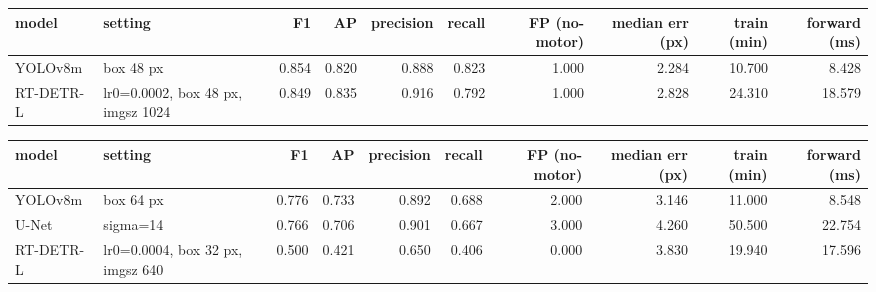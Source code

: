 \begin{tabular}{llrrrrrrrr}
\toprule
model & setting & F1 & AP & precision & recall & FP (no-motor) & median err (px) & train (min) & forward (ms) \\
\midrule
YOLOv8m & box 48 px & 0.854 & 0.820 & 0.888 & 0.823 & 1.000 & 2.284 & 10.700 & 8.428 \\
RT-DETR-L & lr0=0.0002, box 48 px, imgsz 1024 & 0.849 & 0.835 & 0.916 & 0.792 & 1.000 & 2.828 & 24.310 & 18.579 \\
\bottomrule
\end{tabular}

\begin{tabular}{llrrrrrrrr}
\toprule
model & setting & F1 & AP & precision & recall & FP (no-motor) & median err (px) & train (min) & forward (ms) \\
\midrule
YOLOv8m & box 64 px & 0.776 & 0.733 & 0.892 & 0.688 & 2.000 & 3.146 & 11.000 & 8.548 \\
U-Net & sigma=14 & 0.766 & 0.706 & 0.901 & 0.667 & 3.000 & 4.260 & 50.500 & 22.754 \\
RT-DETR-L & lr0=0.0004, box 32 px, imgsz 640 & 0.500 & 0.421 & 0.650 & 0.406 & 0.000 & 3.830 & 19.940 & 17.596 \\
\bottomrule
\end{tabular}

